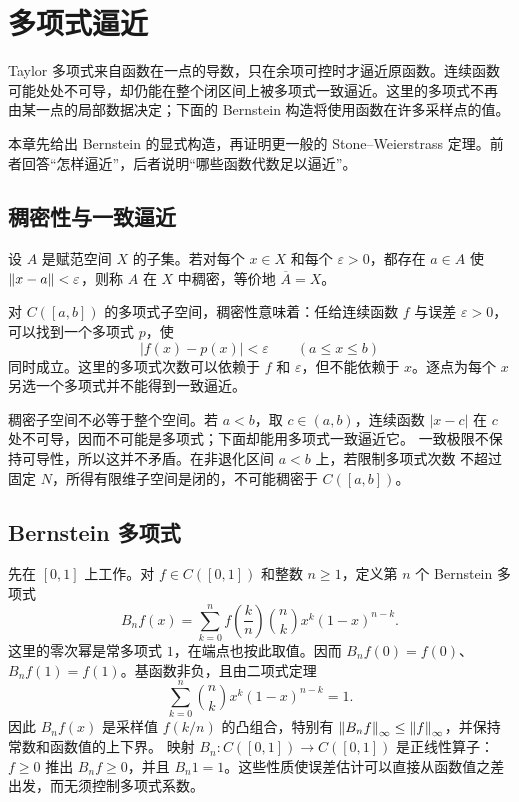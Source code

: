 \chapter{多项式逼近}
\label{chap:polynomial-approximation}

Taylor 多项式来自函数在一点的导数，只在余项可控时才逼近原函数。连续函数
可能处处不可导，却仍能在整个闭区间上被多项式一致逼近。这里的多项式不再
由某一点的局部数据决定；下面的 Bernstein 构造将使用函数在许多采样点的值。

本章先给出 Bernstein 的显式构造，再证明更一般的 Stone--Weierstrass
定理。前者回答“怎样逼近”，后者说明“哪些函数代数足以逼近”。

\section{稠密性与一致逼近}

设 $A$ 是赋范空间 $X$ 的子集。若对每个 $x\in X$ 和每个
$\varepsilon>0$，都存在 $a\in A$ 使 $\left\lVert x-a\right\rVert<\varepsilon$，则称 $A$
在 $X$ 中稠密，等价地 $\overline A=X$。

对 $C([a,b])$ 的多项式子空间，稠密性意味着：任给连续函数 $f$ 与误差
$\varepsilon>0$，可以找到一个多项式 $p$，使
\[
 |f(x)-p(x)|<\varepsilon\qquad(a\le x\le b)
\]
同时成立。这里的多项式次数可以依赖于 $f$ 和 $\varepsilon$，但不能依赖于
$x$。逐点为每个 $x$ 另选一个多项式并不能得到一致逼近。

稠密子空间不必等于整个空间。若 $a<b$，取 $c\in(a,b)$，连续函数
$|x-c|$ 在 $c$ 处不可导，因而不可能是多项式；下面却能用多项式一致逼近它。
一致极限不保持可导性，所以这并不矛盾。在非退化区间 $a<b$ 上，若限制多项式次数
不超过固定 $N$，所得有限维子空间是闭的，不可能稠密于 $C([a,b])$。

\section{Bernstein 多项式}

先在 $[0,1]$ 上工作。对 $f\in C([0,1])$ 和整数 $n\ge1$，定义第 $n$ 个 Bernstein 多项式
\[
 B_nf(x)=\sum_{k=0}^n f\left(\frac kn\right)
 \binom nk x^k(1-x)^{n-k}.
\]
这里的零次幂是常多项式 $1$，在端点也按此取值。因而
$B_nf(0)=f(0)$、$B_nf(1)=f(1)$。基函数非负，且由二项式定理
\[
 \sum_{k=0}^n\binom nkx^k(1-x)^{n-k}=1.
\]
因此 $B_nf(x)$ 是采样值 $f(k/n)$ 的凸组合，特别有
$\left\lVert B_nf\right\rVert_\infty\le\left\lVert f\right\rVert_\infty$，并保持常数和函数值的上下界。
映射 $B_n:C([0,1])\to C([0,1])$ 是正线性算子：$f\ge0$ 推出
$B_nf\ge0$，并且 $B_n1=1$。这些性质使误差估计可以直接从函数值之差
出发，而无须控制多项式系数。

